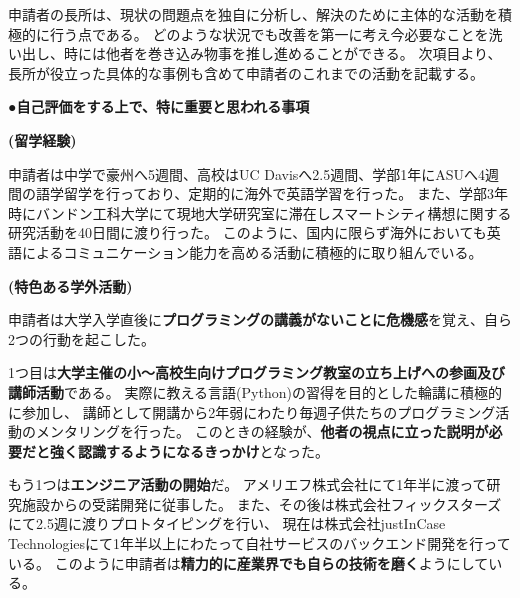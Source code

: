 {申請者の長所は、現状の問題点を独自に分析し、解決のために主体的な活動を積極的に行う点である。
どのような状況でも改善を第一に考え今必要なことを洗い出し、時には他者を巻き込み物事を推し進めることができる。
次項目より、長所が役立った具体的な事例も含めて申請者のこれまでの活動を記載する。

\noindent
●\textbf{自己評価をする上で、特に重要と思われる事項}

%

\textbf{(留学経験)}

申請者は中学で豪州へ5週間、高校はUC Davisへ2.5週間、学部1年にASUへ4週間の語学留学を行っており、定期的に海外で英語学習を行った。
また、学部3年時にバンドン工科大学にて現地大学研究室に滞在しスマートシティ構想に関する研究活動を40日間に渡り行った。
このように、国内に限らず海外においても英語によるコミュニケーション能力を高める活動に積極的に取り組んでいる。

\textbf{(特色ある学外活動)}

申請者は大学入学直後に\textbf{プログラミングの講義がないことに危機感}を覚え、自ら2つの行動を起こした。

1つ目は\textbf{大学主催の小〜高校生向けプログラミング教室の立ち上げへの参画及び講師活動}\cite{uecprog}である。
実際に教える言語(Python)の習得を目的とした輪講に積極的に参加し、
講師として開講から2年弱にわたり毎週子供たちのプログラミング活動のメンタリングを行った。
このときの経験が、\textbf{他者の視点に立った説明が必要だと強く認識するようになるきっかけ}となった。

もう1つは\textbf{エンジニア活動の開始}だ。
アメリエフ株式会社にて1年半に渡って研究施設からの受諾開発に従事した\cite{amelieff}。
また、その後は株式会社フィックスターズにて2.5週に渡りプロトタイピングを行い、
現在は株式会社justInCase Technologiesにて1年半以上にわたって自社サービスのバックエンド開発を行っている。
このように申請者は\textbf{精力的に産業界でも自らの技術を磨く}ようにしている。

}
